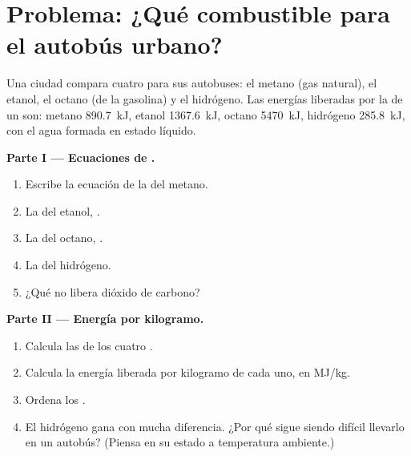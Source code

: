 \section{Problema: ¿Qué combustible para el autobús urbano?}

\begin{problem}
\label{pb:g11:reaction-energy:1}
Una ciudad compara cuatro  para sus autobuses: el metano
(gas natural), el etanol, el octano (de la gasolina) y el hidrógeno. Las
energías liberadas por la  de un  son: metano
\qty{890.7}{kJ}, etanol \qty{1367.6}{kJ}, octano \qty{5470}{kJ},
hidrógeno \qty{285.8}{kJ}, con el agua formada en estado líquido.

\medskip
\noindent\textbf{Parte I --- Ecuaciones de .}
\begin{enumerate}
  \item Escribe la ecuación de la  del metano.
  \item La del etanol, .
  \item La del octano, .
  \item La del hidrógeno.
  \item ¿Qué  no libera dióxido de carbono?
\end{enumerate}

\medskip
\noindent\textbf{Parte II --- Energía por kilogramo.}
\begin{enumerate}[resume]
  \item Calcula las  de los cuatro .
  \item Calcula la energía liberada por kilogramo de cada uno, en
        \si{MJ/kg}.
  \item Ordena los .
  \item El hidrógeno gana con mucha diferencia. ¿Por qué sigue siendo
        difícil llevarlo en un autobús? (Piensa en su estado a
        temperatura ambiente.)
\end{enumerate}


\end{problem}
